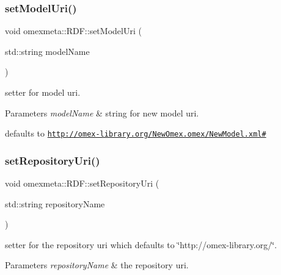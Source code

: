 \subsubsection{\texorpdfstring{set\+Model\+Uri()}{setModelUri()}}
{\footnotesize\ttfamily void omexmeta\+::\+R\+D\+F\+::set\+Model\+Uri (\begin{DoxyParamCaption}\item[{std\+::string}]{model\+Name }\end{DoxyParamCaption})}



setter for model uri. 


\begin{DoxyParams}{Parameters}
{\em model\+Name} & string for new model uri.\\
\hline
\end{DoxyParams}
defaults to \href{http://omex-library.org/NewOmex.omex/NewModel.xml#}{\tt http\+://omex-\/library.\+org/\+New\+Omex.\+omex/\+New\+Model.\+xml\#} \mbox{\label{classomexmeta_1_1RDF_a9e8669ac5cf5dbcaf235f535f7482a7a}} 
\subsubsection{\texorpdfstring{set\+Repository\+Uri()}{setRepositoryUri()}}
{\footnotesize\ttfamily void omexmeta\+::\+R\+D\+F\+::set\+Repository\+Uri (\begin{DoxyParamCaption}\item[{std\+::string}]{repository\+Name }\end{DoxyParamCaption})}



setter for the repository uri which defaults to \char`\"{}http\+://omex-\/library.\+org/\char`\"{}. 


\begin{DoxyParams}{Parameters}
{\em repository\+Name} & the repository uri. \\
\hline
\end{DoxyParams}
\mbox{\label{classomexmeta_1_1RDF_a8fc7b226619580fac47afce0a7ec2628}} 
